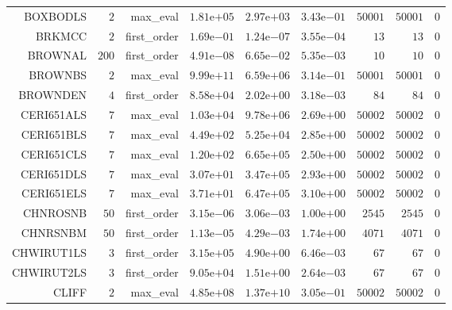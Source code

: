 \begin{longtable}{rrrrrrrrr}
BOXBODLS & \(     2\) & max\_eval & \( 1.81\)e\(+05\) & \( 2.97\)e\(+03\) & \( 3.43\)e\(-01\) & \( 50001\) & \( 50001\) & \(     0\) \\
BRKMCC & \(     2\) & first\_order & \( 1.69\)e\(-01\) & \( 1.24\)e\(-07\) & \( 3.55\)e\(-04\) & \(    13\) & \(    13\) & \(     0\) \\
BROWNAL & \(   200\) & first\_order & \( 4.91\)e\(-08\) & \( 6.65\)e\(-02\) & \( 5.35\)e\(-03\) & \(    10\) & \(    10\) & \(     0\) \\
BROWNBS & \(     2\) & max\_eval & \( 9.99\)e\(+11\) & \( 6.59\)e\(+06\) & \( 3.14\)e\(-01\) & \( 50001\) & \( 50001\) & \(     0\) \\
BROWNDEN & \(     4\) & first\_order & \( 8.58\)e\(+04\) & \( 2.02\)e\(+00\) & \( 3.18\)e\(-03\) & \(    84\) & \(    84\) & \(     0\) \\
CERI651ALS & \(     7\) & max\_eval & \( 1.03\)e\(+04\) & \( 9.78\)e\(+06\) & \( 2.69\)e\(+00\) & \( 50002\) & \( 50002\) & \(     0\) \\
CERI651BLS & \(     7\) & max\_eval & \( 4.49\)e\(+02\) & \( 5.25\)e\(+04\) & \( 2.85\)e\(+00\) & \( 50002\) & \( 50002\) & \(     0\) \\
CERI651CLS & \(     7\) & max\_eval & \( 1.20\)e\(+02\) & \( 6.65\)e\(+05\) & \( 2.50\)e\(+00\) & \( 50002\) & \( 50002\) & \(     0\) \\
CERI651DLS & \(     7\) & max\_eval & \( 3.07\)e\(+01\) & \( 3.47\)e\(+05\) & \( 2.93\)e\(+00\) & \( 50002\) & \( 50002\) & \(     0\) \\
CERI651ELS & \(     7\) & max\_eval & \( 3.71\)e\(+01\) & \( 6.47\)e\(+05\) & \( 3.10\)e\(+00\) & \( 50002\) & \( 50002\) & \(     0\) \\
CHNROSNB & \(    50\) & first\_order & \( 3.15\)e\(-06\) & \( 3.06\)e\(-03\) & \( 1.00\)e\(+00\) & \(  2545\) & \(  2545\) & \(     0\) \\
CHNRSNBM & \(    50\) & first\_order & \( 1.13\)e\(-05\) & \( 4.29\)e\(-03\) & \( 1.74\)e\(+00\) & \(  4071\) & \(  4071\) & \(     0\) \\
CHWIRUT1LS & \(     3\) & first\_order & \( 3.15\)e\(+05\) & \( 4.90\)e\(+00\) & \( 6.46\)e\(-03\) & \(    67\) & \(    67\) & \(     0\) \\
CHWIRUT2LS & \(     3\) & first\_order & \( 9.05\)e\(+04\) & \( 1.51\)e\(+00\) & \( 2.64\)e\(-03\) & \(    67\) & \(    67\) & \(     0\) \\
CLIFF & \(     2\) & max\_eval & \( 4.85\)e\(+08\) & \( 1.37\)e\(+10\) & \( 3.05\)e\(-01\) & \( 50002\) & \( 50002\) & \(     0\) \\

\end{longtable}
